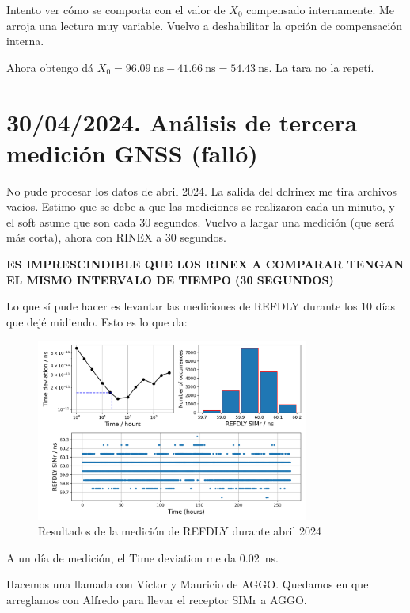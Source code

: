 \documentclass[11pt]{article}
\begin{document}
Intento ver cómo se comporta con el valor de $X_0$ compensado internamente. Me arroja una lectura muy variable. Vuelvo a deshabilitar la opción de compensación interna.

Ahora obtengo dá $X_0 = \SI{96.09}{\nano\second} - \SI{41.66}{\nano\second} = \SI{54.43}{\nano\second}$. La tara no la repetí.

\section{30/04/2024. Análisis de tercera medición GNSS (falló)}

No pude procesar los datos de abril 2024. La salida del dclrinex me tira archivos vacios. Estimo que se debe a que las mediciones se realizaron cada un minuto, y el soft asume que son cada 30 segundos. Vuelvo a largar una medición (que será más corta), ahora con RINEX a 30 segundos. 

\textbf{ES IMPRESCINDIBLE QUE LOS RINEX A COMPARAR TENGAN EL MISMO INTERVALO DE TIEMPO (30 SEGUNDOS)}


Lo que sí pude hacer es levantar las mediciones de REFDLY durante los 10 días que dejé midiendo. Esto es lo que da:


\begin{figure}[ht]
    \begin{center}
    \includegraphics[width=0.8\textwidth]{./figuras/REFDLY_SIMr.png}
        \caption{Resultados de la medición de REFDLY durante abril 2024}
        \label{fig:REFDLY_longterm}
    \end{center}
\end{figure}

A un día de medición, el Time deviation me da \SI{0.02}{\nano\second}.


Hacemos una llamada con Víctor y Mauricio de AGGO. Quedamos en que arreglamos con Alfredo para llevar el receptor SIMr a AGGO.
\end{document}
